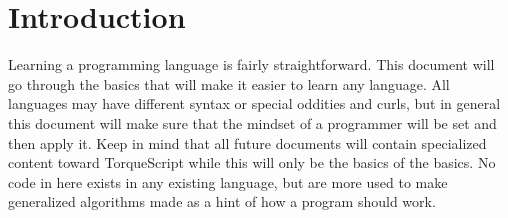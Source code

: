 \section{Introduction}

Learning a programming language is fairly straightforward. This document will go through the basics that will make it easier to learn any language. All languages may have different syntax or special oddities and curls, but in general this document will make sure that the mindset of a programmer will be set and then apply it. Keep in mind that all future documents will contain specialized content toward TorqueScript while this will only be the basics of the basics. No code in here exists in any existing language, but are more used to make generalized algorithms made as a hint of how a program should work.
